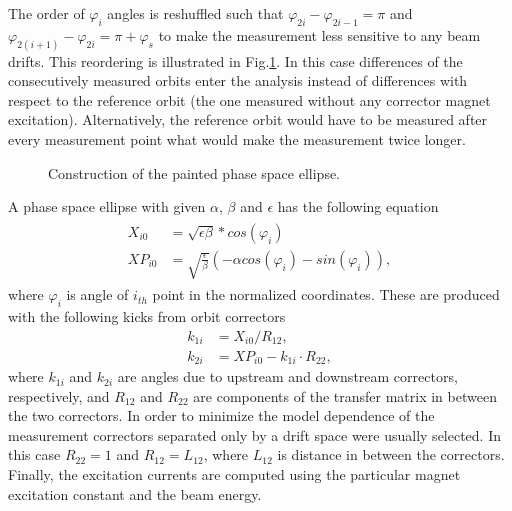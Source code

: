 The order of $\varphi_i$ angles is reshuffled such that 
$\varphi_{2i} - \varphi_{2i-1} = \pi$ and $\varphi_{2(i+1)} - \varphi_{2i} = \pi + \varphi_s$ to make the measurement 
less sensitive to any beam drifts. This reordering is illustrated in Fig.\ref{fig:PhSpEllipseConstr}. 
In this case differences of the consecutively measured orbits enter the analysis instead of 
differences with respect to the reference orbit (the one measured without any corrector magnet excitation). 
Alternatively, the reference orbit would have to be measured after every measurement point what would make 
the measurement twice longer. 

\begin{figure}[!h]
 \begin{center}
 \end{center}
 \caption{Construction of the painted phase space ellipse.}
 \label{fig:PhSpEllipseConstr}
\end{figure}


A phase space ellipse with given $\alpha$, $\beta$ and $\epsilon$ has the following equation
\begin{align}
\begin{split}
   X_{i0}  &=  \sqrt{ \epsilon \beta } *cos(\varphi_i) \\
   XP_{i0} &=  \sqrt{ \frac{\epsilon } {\beta}} (-\alpha cos(\varphi_i)-sin(\varphi_i)) ,
\end{split}
\label{eq302_ellipseEq}
\end{align}
where  $\varphi_i$ is angle of $i_{th}$ point in the normalized coordinates. 
These are produced with the following kicks from orbit correctors 
\begin{align*}
   k_{1i} &=  X_{i0}/R_{12}, \\
   k_{2i} &=  XP_{i0} - k_{1i} \cdot R_{22},
\end{align*}
where $k_{1i}$ and $k_{2i}$ are angles due to upstream and downstream correctors, respectively, 
and $R_{12}$ and $R_{22}$ are components of the transfer matrix in between the two correctors. 
In order to minimize the model dependence of the measurement 
correctors separated only by a drift space were usually selected. 
In this case $R_{22}=1$ and $R_{12}=L_{12}$, where $L_{12}$ is distance in between the correctors. 
Finally, the excitation currents are computed using the particular magnet excitation constant and the beam energy.

